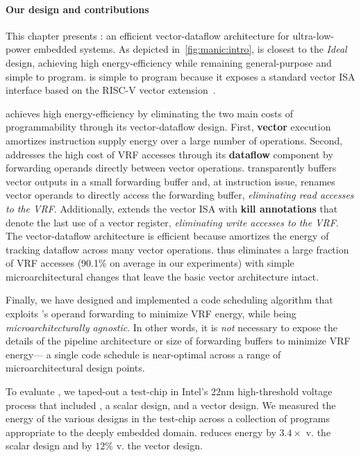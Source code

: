 \figMANICDesignSpace

\paragraph{Our design and contributions}
This chapter presents \manic: an efficient vector-dataflow
architecture for ultra-low-power embedded systems.  
%
As depicted in~\autoref{fig:manic:intro}, \manic is closest to the \textit{Ideal} design, achieving high energy-efficiency while remaining general-purpose and simple to program.
%
%
\manic is simple to program because it exposes a standard vector ISA interface
based on the RISC-V vector extension~\cite{riscv_2019}.

\manic achieves high energy-efficiency by eliminating the two main costs of
programmability through its vector-dataflow design.
%
First, \textbf{vector} execution amortizes
instruction supply energy over a large number of operations.
%
Second, \manic addresses the high cost of VRF accesses
through its \textbf{dataflow} component by forwarding operands 
directly between vector operations.
%
\manic transparently buffers vector outputs in a small {forwarding buffer}
and, at instruction issue, renames vector operands to directly access
the forwarding buffer, \emph{eliminating read accesses to the VRF}.
%
Additionally, \manic extends the vector ISA with \textbf{kill annotations} that denote
the last use of a vector register,
\emph{eliminating write accesses to the VRF}.
%
The vector-dataflow architecture is efficient because \manic amortizes the energy of tracking dataflow across many vector operations.
%
\manic thus eliminates a large fraction of VRF accesses (90.1\% on average in our experiments)
with simple microarchitectural changes that leave the basic vector architecture intact.

Finally, we have designed and implemented a code scheduling algorithm
that exploits \manic's operand forwarding to minimize VRF energy, while being \emph{microarchitecturally agnostic}.
In other words, it is \emph{not} necessary to expose the details
of the pipeline architecture or size of forwarding buffers
to minimize VRF energy---%
a single code schedule is near-optimal across a range of microarchitectural design points.

To evaluate \manic, we taped-out a test-chip in Intel's 22nm high-threshold voltage process that included \manic, a scalar design, and a vector design.
We measured the energy of the various designs in the test-chip across a collection of programs appropriate to the deeply embedded domain.
%
\manic reduces energy by $3.4\times$ v. the scalar design and by $12\%$ v. the vector design.
% 
%